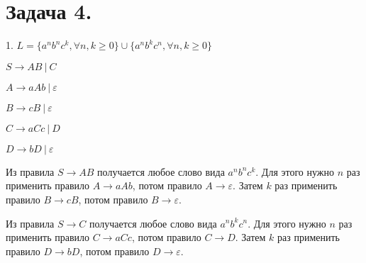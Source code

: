 \documentclass[12pt]{article}
\theoremstyle{definition}
\theoremstyle{definition}
\let\geq\geqslant
\let\ra\rightarrow
\let\epsilon\varepsilon
\let\eps\varepsilon
\begin{document}
\section*{Задача  4.}
1. $L = \{a^nb^nc^k, \forall n, k \geq 0 \} \cup \{a^nb^kc^n, \forall n, k \geq 0 \}$

	$S \ra AB\ |\ C$
	
	$A\ra aAb\ |\ \eps$
	
	$B\ra cB\ |\ \epsilon$ 
	
	$C\ra aCc\ |\ D$
	
	$D\ra bD\ |\ \epsilon$
	
	Из правила $S \ra AB$ получается любое слово вида $a^nb^nc^k$. Для этого нужно $n$ раз применить правило $A\ra aAb$, потом правило $A\ra \epsilon$.  Затем $k$ раз применить правило $B\ra cB$, потом правило $B\ra \epsilon$.
		
	Из правила $S \ra C$ получается любое слово вида $a^nb^kc^n$. Для этого нужно $n$ раз применить правило $C\ra aCc$, потом правило $C\ra D$.  Затем $k$ раз применить правило $D\ra bD$, потом правило $D\ra \epsilon$.
\end{document}
